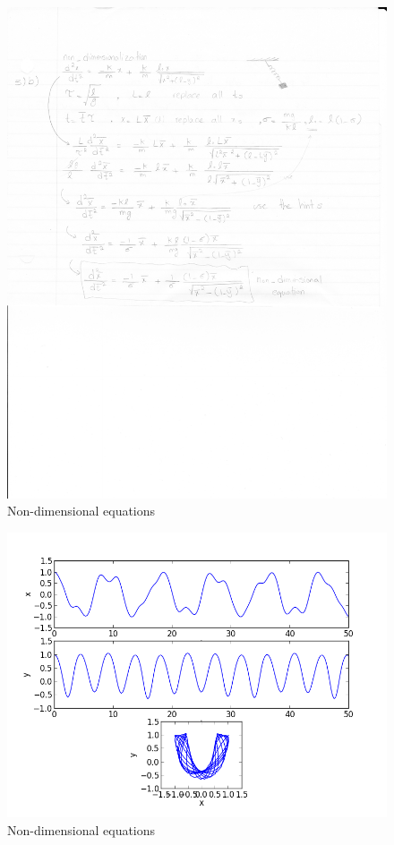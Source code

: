 \documentclass[letterpaper,12pt]{article}
\begin{document}
\FloatBarrier
\begin{figure}[h!]
\centering
\includegraphics[scale=0.7]{3_b_2.pdf}
\caption{Non-dimensional equations}

\end{figure}
\FloatBarrier


\FloatBarrier
\begin{figure}[h!]
\centering
\includegraphics[scale=0.7]{3_c.png}
\caption{Non-dimensional equations}

\end{figure}
\FloatBarrier
\end{document}
